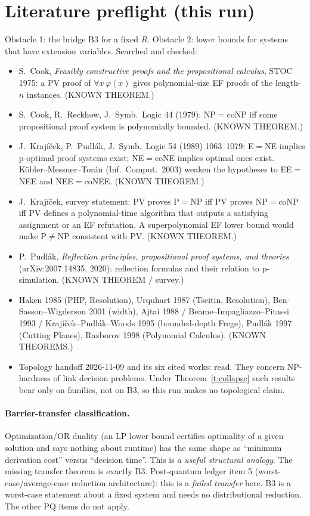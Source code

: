 \documentclass[11pt]{article}
\theoremstyle{definition}
\theoremstyle{remark}
\begin{document}
\section{Literature preflight (this run)}
Obstacle 1: the bridge B3 for a fixed $R$. Obstacle 2: lower bounds for systems that have extension variables. Searched and checked:
\begin{itemize}
\item S.~Cook, \emph{Feasibly constructive proofs and the propositional calculus}, STOC 1975: a PV proof of $\forall x\,\varphi(x)$ gives polynomial-size EF proofs of the length-$n$ instances. (KNOWN THEOREM.)
\item S.~Cook, R.~Reckhow, J.~Symb.~Logic 44 (1979): NP$=$coNP iff some propositional proof system is polynomially bounded. (KNOWN THEOREM.)
\item J.~Krajíček, P.~Pudlák, J.~Symb.~Logic 54 (1989) 1063--1079: E$=$NE implies p-optimal proof systems exist; NE$=$coNE implies optimal ones exist. Köbler--Messner--Torán (Inf.~Comput.~2003) weaken the hypotheses to EE$=$NEE and NEE$=$coNEE. (KNOWN THEOREM.)
\item J.~Krajíček, survey statement: PV proves P$=$NP iff PV proves NP$=$coNP iff PV defines a polynomial-time algorithm that outputs a satisfying assignment or an EF refutation. A superpolynomial EF lower bound would make P$\ne$NP consistent with PV. (KNOWN THEOREM.)
\item P.~Pudlák, \emph{Reflection principles, propositional proof systems, and theories} (arXiv:2007.14835, 2020): reflection formulas and their relation to p-simulation. (KNOWN THEOREM / survey.)
\item Haken 1985 (PHP, Resolution), Urquhart 1987 (Tseitin, Resolution), Ben-Sasson--Wigderson 2001 (width), Ajtai 1988 / Beame--Impagliazzo--Pitassi 1993 / Krajíček--Pudlák--Woods 1995 (bounded-depth Frege), Pudlák 1997 (Cutting Planes), Razborov 1998 (Polynomial Calculus). (KNOWN THEOREMS.)
\item Topology handoff 2026-11-09 and its six cited works: read. They concern NP-hardness of link decision problems. Under Theorem~\ref{t:collapse} such results bear only on families, not on B3, so this run makes no topological claim.
\end{itemize}

\paragraph{Barrier-transfer classification.} Optimization/OR duality (an LP lower bound certifies optimality of a given solution and says nothing about runtime) has the same shape as ``minimum derivation cost'' versus ``decision time''. This is a \emph{useful structural analogy}. The missing transfer theorem is exactly B3. Post-quantum ledger item 5 (worst-case/average-case reduction architecture): this is a \emph{failed transfer} here. B3 is a worst-case statement about a fixed system and needs no distributional reduction. The other PQ items do not apply.
\end{document}
